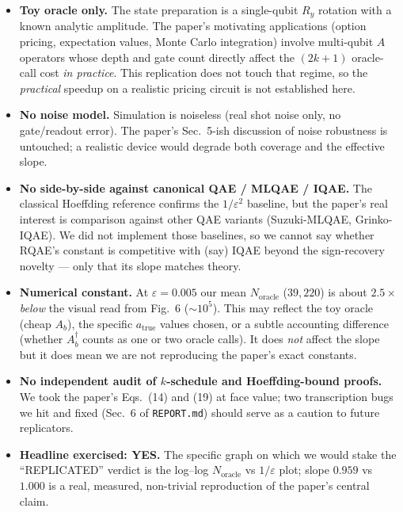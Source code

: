 \documentclass[11pt]{article}
\begin{document}
\begin{itemize}
  \item \textbf{Toy oracle only.} The state preparation is a single-qubit
    $R_y$ rotation with a known analytic amplitude. The paper's motivating
    applications (option pricing, expectation values, Monte Carlo integration)
    involve multi-qubit $A$ operators whose depth and gate count directly
    affect the $(2k+1)$ oracle-call cost \emph{in practice}. This
    replication does not touch that regime, so the \emph{practical} speedup
    on a realistic pricing circuit is not established here.
  \item \textbf{No noise model.} Simulation is noiseless (real shot noise
    only, no gate/readout error). The paper's Sec.~5-ish discussion of
    noise robustness is untouched; a realistic device would degrade both
    coverage and the effective slope.
  \item \textbf{No side-by-side against canonical QAE / MLQAE / IQAE.}
    The classical Hoeffding reference confirms the $1/\varepsilon^{2}$
    baseline, but the paper's real interest is comparison against other
    QAE variants (Suzuki-MLQAE, Grinko-IQAE). We did not implement those
    baselines, so we cannot say whether RQAE's constant is competitive with
    (say) IQAE beyond the sign-recovery novelty --- only that its slope
    matches theory.
  \item \textbf{Numerical constant.} At $\varepsilon = 0.005$ our mean
    $N_{\text{oracle}}$ ($39{,}220$) is about $2.5\times$ \emph{below} the
    visual read from Fig.~6 ($\sim 10^{5}$). This may reflect the toy oracle
    (cheap $A_b$), the specific $a_{\text{true}}$ values chosen, or a subtle
    accounting difference (whether $A_b^{\dagger}$ counts as one or two
    oracle calls). It does \emph{not} affect the slope but it does mean we
    are not reproducing the paper's exact constants.
  \item \textbf{No independent audit of $k$-schedule and Hoeffding-bound
    proofs.} We took the paper's Eqs.~(14) and (19) at face value; two
    transcription bugs we hit and fixed (Sec.~6 of \texttt{REPORT.md})
    should serve as a caution to future replicators.
  \item \textbf{Headline exercised: YES.} The specific graph on which we
    would stake the ``REPLICATED'' verdict is the log--log $N_{\text{oracle}}$
    vs $1/\varepsilon$ plot; slope $0.959$ vs $1.000$ is a real, measured,
    non-trivial reproduction of the paper's central claim.
\end{itemize}
\end{document}
